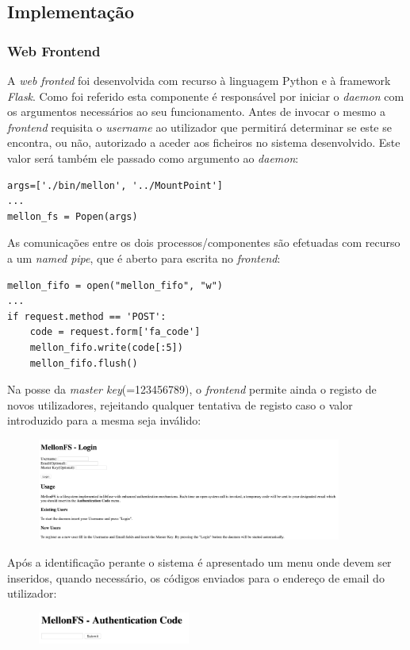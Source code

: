 \documentclass{article}
\begin{document}
\subsection{Implementação}
\subsubsection{Web Frontend}
A \textit{web fronted} foi desenvolvida com recurso à linguagem Python e à framework \textit{Flask}.
Como foi referido esta componente é responsável por iniciar o \textit{daemon} com os argumentos necessários ao seu funcionamento.
Antes de invocar o mesmo a \textit{frontend} requisita o \textit{username} ao utilizador que permitirá determinar se este se 
encontra, ou não, autorizado a aceder aos ficheiros no sistema desenvolvido. Este valor será também ele passado como argumento ao 
\textit{daemon}:
\begin{Verbatim}
args=['./bin/mellon', '../MountPoint']
...
mellon_fs = Popen(args)
\end{Verbatim}
As comunicações entre os dois processos/componentes são efetuadas com recurso a um \textit{named pipe}, que é aberto para escrita no 
\textit{frontend}:
\begin{Verbatim}
mellon_fifo = open("mellon_fifo", "w")
...
if request.method == 'POST':
    code = request.form['fa_code']
    mellon_fifo.write(code[:5])
    mellon_fifo.flush()
\end{Verbatim}
Na posse da \textit{master key}(=123456789), o \textit{frontend} permite ainda o registo de novos utilizadores,
rejeitando qualquer tentativa de registo caso o valor introduzido para a mesma seja inválido:
\begin{figure}[H]
    \centering
    \includegraphics[width=10cm]{Pictures/Main.png}
\end{figure}
Após a identificação perante o sistema é apresentado um menu onde devem ser inseridos, quando necessário, os códigos enviados para o endereço
de email do utilizador:
\begin{figure}[H]
    \centering
    \includegraphics[width=5cm]{Pictures/Auth.png}
\end{figure}
\end{document}
